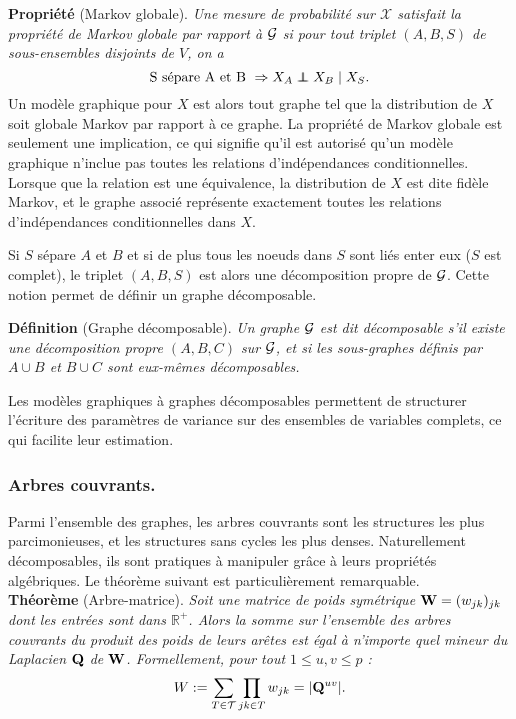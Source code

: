 \textbf{Propriété} (Markov globale). \textit{Une mesure de probabilité sur $\mathcal{X}$ satisfait la propriété de Markov globale  par rapport à $\mathcal{G}$ si pour tout triplet $(A, B, S)$ de sous-ensembles disjoints de $V$, on a
$$\text{S sépare A et B } \Rightarrow X_A\independent X_B \mid X_S.$$ }
Un modèle graphique pour $X$ est alors tout graphe tel que la distribution de $X$ soit globale Markov par rapport à ce graphe. La propriété de Markov globale est seulement une implication, ce qui signifie qu'il est autorisé qu'un modèle graphique n'inclue pas toutes les relations d'indépendances conditionnelles. Lorsque que la relation est une équivalence, la distribution de $X$ est dite fidèle Markov, et le graphe associé représente exactement toutes les relations d'indépendances conditionnelles dans $X$.


Si $S$ sépare $A$ et $B$ et si de plus tous les noeuds dans $S$ sont liés enter eux ($S$ est complet), le triplet $(A,B,S)$ est alors une décomposition propre de $\mathcal{G}$. Cette notion permet de définir un graphe décomposable.


\textbf{Définition} (Graphe décomposable). \textit{Un graphe $\mathcal{G}$ est dit décomposable s'il existe une décomposition propre $(A, B, C)$ sur $\mathcal{G}$, et si les sous-graphes définis par $A\cup B$ et $B\cup C$ sont eux-mêmes décomposables.}


Les modèles graphiques à graphes décomposables permettent de structurer l'écriture des paramètres de variance sur des ensembles de variables complets, ce qui facilite leur estimation. 

\subsubsection*{Arbres couvrants.}
Parmi l'ensemble des graphes, les arbres couvrants sont les structures les plus parcimonieuses, et les structures sans cycles les plus denses. Naturellement décomposables, ils sont pratiques à manipuler grâce à leurs propriétés algébriques. Le théorème suivant est particulièrement remarquable.\\


\textbf{Théorème} (Arbre-matrice). \textit{Soit une matrice de poids symétrique ${\bf W}=(w_{jk})_{jk}$ dont les entrées sont dans $\mathds{R}^+$. Alors la somme sur l'ensemble des arbres couvrants du produit des poids de leurs arêtes est égal à n'importe quel mineur du Laplacien ${\bf Q}$ de ${\bf W}$. Formellement, pour tout $1 \leq u, v \leq p$ :
   \[  W := \sum_{T\in\mathcal{T}} \prod_{jk\in T} w_{jk} = |{\bf Q}^{uv}|.  \]
   }
   
